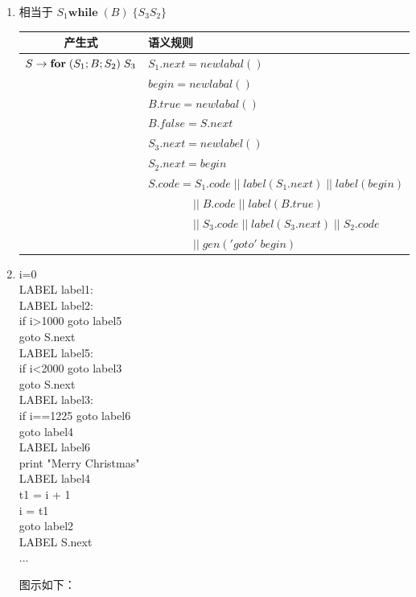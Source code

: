 \documentclass[a4paper, justified]{tufte-handout}
\begin{document}
\begin{solution}
  \begin{enumerate}[(1)]
    \item  相当于 $S_{1}\textbf{while}\;(B)\; \{S_{3}S_{2}\}$
    \begin{table}[!htbp]
      \centering
      \begin{tabular}{|c|l|}
        \cline{1-2}
        产生式&语义规则\\    
        \hline
        $S \rightarrow \text{\bf for} \;(S_{1}; B; S_{2})\; S_{3}$ & $S_1.next = newlabal()$ \\ 
        &  $begin = newlabal()$ \\ 
        &  $B.true = newlabal()$ \\ 
        &  $B.false = S.next$ \\ 
        &  $S_3.next = newlabel()$ \\ 
        &  $S_2.next = begin$ \\ 
        &  $S.code = S_1.code \; || \; label(S_1.next) \; || \; label(begin)$ \\ 
        &  $ \qquad\qquad || \; B.code  \; || \; label(B.true)$ \\ 
        &  $ \qquad\qquad || \; S_3.code  \; || \; label(S_3.next) \; || \; S_2.code $ \\ 
        &  $ \qquad\qquad || \; gen('goto' \; begin)$ \\ 
        \hline
      \end{tabular}
    \end{table}

    \item  i=0\\
        LABEL label1:\\
        LABEL label2:\\
        if i>1000 goto label5\\
        goto S.next\\
        LABEL label5: \\
        if i<2000 goto label3\\
        goto S.next\\
        LABEL label3:\\
        if i==1225 goto label6\\
        goto label4\\
        LABEL label6\\
        print "Merry Christmas"\\
        LABEL label4\\
        t1 = i + 1\\
        i = t1\\
        goto label2\\
        LABEL S.next\\
        ...

       图示如下：\\ 
  \end{enumerate}
\end{solution}
\end{document}
